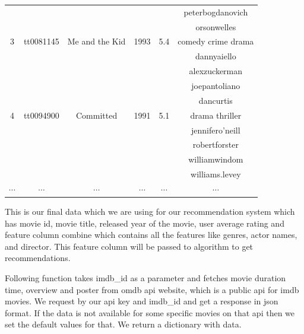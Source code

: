 \begin{table}[ht]
\begin{tabular}{cccccc}
		         &           &                               &          &          & peterbogdanovich   \\ 
		         &           &                               &          &          & orsonwelles        \\
		3        & tt0081145 & Me and the Kid                & 1993     & 5.4      & comedy crime drama \\
		         &           &                               &          &          & dannyaiello        \\ 
		         &           &                               &          &          & alexzuckerman      \\
		         &           &                               &          &          & joepantoliano      \\
		         &           &                               &          &          & dancurtis          \\
		4        & tt0094900 & Committed                     & 1991     & 5.1      & drama thriller     \\
		         &           &                               &          &          & jennifero’neill    \\ 
		         &           &                               &          &          & robertforster      \\
		         &           &                               &          &          & williamwindom      \\
		         &           &                               &          &          & williams.levey     \\
		$\cdots$ & $\cdots$  & $\cdots$                      & $\cdots$ & $\cdots$ & $\cdots$           \\
		\bottomrule
	\end{tabular}	
 	\label{tab:final}
\end{table}

This is our final data which we are using for our recommendation system which has movie id, movie title, released year of the movie, user average rating and feature column combine which contains all the features like genres, actor names, and director. This feature column will be passed to algorithm to get recommendations.

Following function takes imdb\_id as a parameter and fetches movie duration time, overview and poster from omdb api website, which is a public api for imdb movies. We request by our api key and imdb\_id and get a response in json format. If the data is not available for some specific movies on that api then we set the default values for that. We return a dictionary with data.

